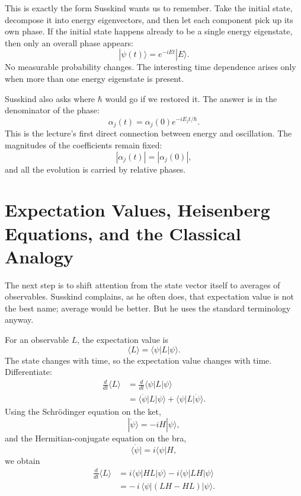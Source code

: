 This is exactly the form Susskind wants us to remember. Take the initial state, decompose it into energy eigenvectors, and then let each component pick up its own phase. If the initial state happens already to be a single energy eigenstate, then only an overall phase appears:
\begin{equation}
|\psi(t)\rangle = e^{-iEt}|E\rangle.
\end{equation}
No measurable probability changes. The interesting time dependence arises only when more than one energy eigenstate is present.

Susskind also asks where \(\hbar\) would go if we restored it. The answer is in the denominator of the phase:
\begin{equation}
\alpha_j(t)=\alpha_j(0)e^{-iE_j t/\hbar}.
\end{equation}
This is the lecture's first direct connection between energy and oscillation. The magnitudes of the coefficients remain fixed:
\begin{equation}
|\alpha_j(t)|=|\alpha_j(0)|,
\end{equation}
and all the evolution is carried by relative phases.

\section{Expectation Values, Heisenberg Equations, and the Classical Analogy}

The next step is to shift attention from the state vector itself to averages of observables. Susskind complains, as he often does, that expectation value is not the best name; average would be better. But he uses the standard terminology anyway.

For an observable \(L\), the expectation value is
\begin{equation}
\langle L\rangle = \langle \psi|L|\psi\rangle.
\end{equation}
The state changes with time, so the expectation value changes with time. Differentiate:
\begin{align}
\frac{d}{dt}\langle L\rangle
&=
\frac{d}{dt}\langle \psi|L|\psi\rangle \\
&=
\langle \dot{\psi}|L|\psi\rangle + \langle \psi|L|\dot{\psi}\rangle.
\end{align}
Using the Schr\"odinger equation on the ket,
\begin{equation}
|\dot{\psi}\rangle = -iH|\psi\rangle,
\end{equation}
and the Hermitian-conjugate equation on the bra,
\begin{equation}
\langle \dot{\psi}| = i\langle \psi|H,
\end{equation}
we obtain
\begin{align}
\frac{d}{dt}\langle L\rangle
&=
i\langle \psi|HL|\psi\rangle - i\langle \psi|LH|\psi\rangle \\
&=
-\,i\,\langle \psi|(LH-HL)|\psi\rangle.
\end{align}

